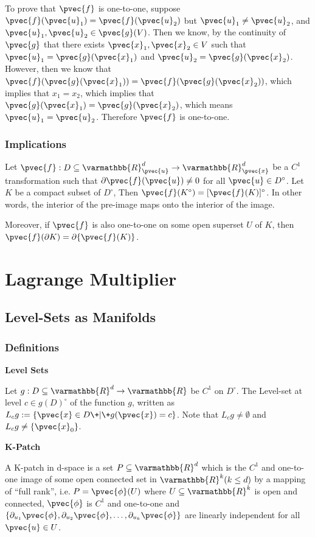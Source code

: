 \documentclass[11 pt, twoside]{article}
\begin{document}
To prove that $\pvec{f}$ is one-to-one, suppose $\pvec{f}(\pvec{u}_1) =
\pvec{f}(\pvec{u}_2)$ but $\pvec{u}_1 \neq \pvec{u}_2$, and $\pvec{u}_1, \pvec{u}_2
\in \pvec{g}(V)$. Then we know, by the continuity of $\pvec{g}$ that there exists
$\pvec{x}_1, \pvec{x}_2 \in V$ such that $\pvec{u}_1 = \pvec{g}(\pvec{x}_1)$ and
$\pvec{u}_2 = \pvec{g}(\pvec{x}_2)$. However, then we know that
$\pvec{f}(\pvec{g}(\pvec{x}_1)) = \pvec{f}(\pvec{g}(\pvec{x}_2))$, which implies that
$x_1 = x_2$, which implies that $\pvec{g}(\pvec{x}_1) = \pvec{g}(\pvec{x}_2)$, which
means $\pvec{u}_1 = \pvec{u}_2$. Therefore $\pvec{f}$ is one-to-one.

\subsubsection{Implications}

Let $\pvec{f}: D \subseteq \varmathbb{R}^d_{\pvec{u}} \to
\varmathbb{R}^d_{\pvec{x}}$ be a $C^1$ transformation such that $\partial
\pvec{f}(\pvec{u}) \neq 0$ for all $\pvec{u} \in D^\circ$. Let $K$ be a compact
subset of $D^\circ$, Then $\pvec{f}(K^\circ) = [\pvec{f}(K)]^\circ$. In other
words, the interior of the pre-image maps onto the interior of the image.

Moreover, if $\pvec{f}$ is also one-to-one on some open superset $U$ of $K$, then
$\pvec{f}(\partial K) = \partial \{\pvec{f}(K)\}$.


\section{Lagrange Multiplier}
\subsection{Level-Sets as Manifolds}

\subsubsection{Definitions}

\textbf{Level Sets}

Let $g: D \subseteq \varmathbb{R}^d \to \varmathbb{R}$ be
$C^1$ on $D^\circ$. The Level-set at level $c \in g(D)^\circ$ of the function $g$, written as
$L_c g := \{\pvec{x} \in D \+|\+ g(\pvec{x}) = c\}$. Note that $L_c g \neq
\emptyset$ and $L_c g \neq \{\pvec{x}_0\}$.

\textbf{K-Patch}

A K-patch in d-space is a set $P \subseteq \varmathbb{R}^d$ which is the $C^1$
and one-to-one image of some open connected set in $\varmathbb{R}^k (k \leq d)$
by a mapping of ``full rank'', i.e. $P = \pvec{\phi}(U)$ where $U \subseteq
\varmathbb{R}^k$ is open and connected, $\pvec{\phi}$ is $C^1$ and one-to-one and
$\{\partial_{u_1} \pvec{\phi}, \partial_{u_2} \pvec{\phi}, \dots, \partial_{u_k}
\pvec{\phi}\}$ are linearly independent for all $\pvec{u} \in U$.
\end{document}

